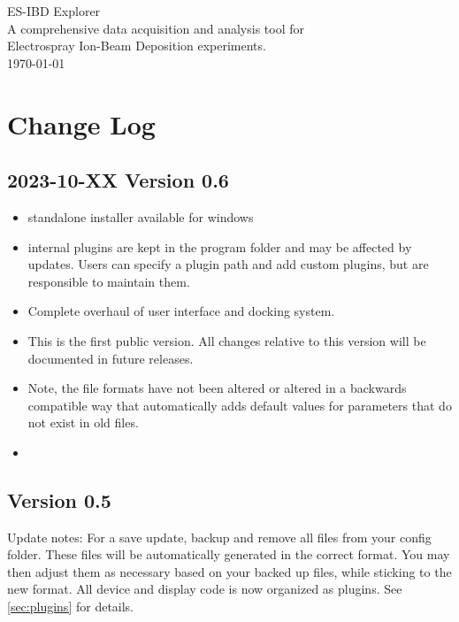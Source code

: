\documentclass[a4paper,11pt,DIV=13]{scrartcl}
\newif\ifverboose
\begin{document}
\begin{centering}
{\LARGE ES-IBD Explorer}\\
\vspace{.5cm}
{\Large A comprehensive data acquisition and analysis tool for \\ Electrospray Ion-Beam Deposition experiments.} \\
\vspace{.5cm}
{\today}\\
\end{centering}

\tableofcontents

\section{Change Log}

\subsection{2023-10-XX Version 0.6}
\begin{itemize}
\item standalone installer available for windows
\item internal plugins are kept in the program folder and may be affected by updates. Users can specify a plugin path and add custom plugins, but are responsible to maintain them.
\item Complete overhaul of user interface and docking system.
\item This is the first public version. All changes relative to this version will be documented in future releases.
\item Note, the file formats have not been altered or altered in a backwards compatible way that automatically adds default values for parameters that do not exist in old files.
\item 
\end{itemize}


\subsection{Version 0.5}
Update notes: For a save update, backup and remove all files from your config folder. These files will be automatically generated in the correct format. You may then adjust them as necessary based on your backed up files, while sticking to the new format.
All device and display code is now organized as plugins. See \ref{sec:plugins} for details.
\end{document}
